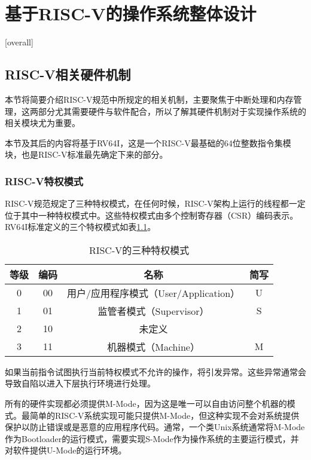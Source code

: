 
\chapter{基于RISC-V的操作系统整体设计}[overall]
\label{chapter:overall}

\section{RISC-V相关硬件机制}

本节将简要介绍RISC-V规范中所规定的相关机制，主要聚焦于中断处理和内存管理，这两部分尤其需要硬件与软件配合，所以了解其硬件机制对于实现操作系统的相关模块尤为重要。

本节及其后的内容将基于RV64I，这是一个RISC-V最基础的64位整数指令集模块，也是RISC-V标准最先确定下来的部分。

\subsection{RISC-V特权模式}

RISC-V规范规定了三种特权模式，在任何时候，RISC-V架构上运行的线程都一定位于其中一种特权模式中。这些特权模式由多个控制寄存器（CSR）编码表示。RV64I标准定义的三个特权模式如表\ref{tab:privilege}。

\begin{table}[h]
	\centering
	\setlength{\belowcaptionskip}{2pt}
	\caption{RISC-V的三种特权模式}
	\label{tab:privilege}
	\begin{tabular}{cccc}
		\hline
		等级 & 编码 & 名称                          & 简写 \\ \hline
		0  & 00 & 用户/应用程序模式（User/Application） & U  \\ 
		1  & 01 & 监管者模式（Supervisor）           & S  \\ 
		2  & 10 & 未定义                         &    \\ 
		3  & 11 & 机器模式（Machine）               & M  \\ \hline
	\end{tabular}
\end{table}

如果当前指令试图执行当前特权模式不允许的操作，将引发异常。这些异常通常会导致自陷以进入下层执行环境进行处理。

所有的硬件实现都必须提供M-Mode，因为这是唯一可以自由访问整个机器的模式。最简单的RISC-V系统实现可能只提供M-Mode，但这种实现不会对系统提供保护以防止错误或是恶意的应用程序代码。通常，一个类Unix系统通常将M-Mode作为Bootloader的运行模式，需要实现S-Mode作为操作系统的主要运行模式，并对软件提供U-Mode的运行环境。

